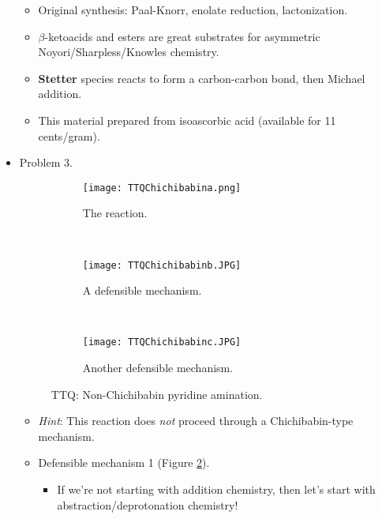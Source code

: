 \documentclass[../notes.tex]{subfiles}
\begin{document}
\begin{itemize}
\begin{itemize}
\begin{itemize}
        \end{itemize}
        \item Original synthesis: Paal-Knorr, enolate reduction, lactonization.
        \item $\beta$-ketoacids and esters are great substrates for asymmetric Noyori/Sharpless/Knowles chemistry.
        \item \textbf{Stetter} species reacts to form a carbon-carbon bond, then Michael addition.
        \item This material prepared from isoascorbic acid (available for 11 cents/gram).
    \end{itemize}
    \item Problem 3.
    \begin{figure}[h!]
        \centering
        \begin{subfigure}[b]{\linewidth}
            \centering
            \texttt{[image: TTQChichibabina.png]}
            \caption{The reaction.}
            \label{fig:TTQChichibabina}
        \end{subfigure}\\[2em]
        \begin{subfigure}[b]{\linewidth}
            \centering
            \texttt{[image: TTQChichibabinb.JPG]}
            \caption{A defensible mechanism.}
            \label{fig:TTQChichibabinb}
        \end{subfigure}\\[2em]
        \begin{subfigure}[b]{\linewidth}
            \centering
            \texttt{[image: TTQChichibabinc.JPG]}
            \caption{Another defensible mechanism.}
            \label{fig:TTQChichibabinc}
        \end{subfigure}
        \caption{TTQ: Non-Chichibabin pyridine amination.}
        \label{fig:TTQChichibabin}
    \end{figure}
    \begin{itemize}
        \item \emph{Hint}: This reaction does \emph{not} proceed through a Chichibabin-type mechanism.
        \item Defensible mechanism 1 (Figure \ref{fig:TTQChichibabinb}).
        \begin{itemize}
            \item If we're not starting with addition chemistry, then let's start with abstraction/deprotonation chemistry!
            \begin{itemize}

\end{itemize}
\end{itemize}
\end{itemize}
\end{itemize}
\end{document}
